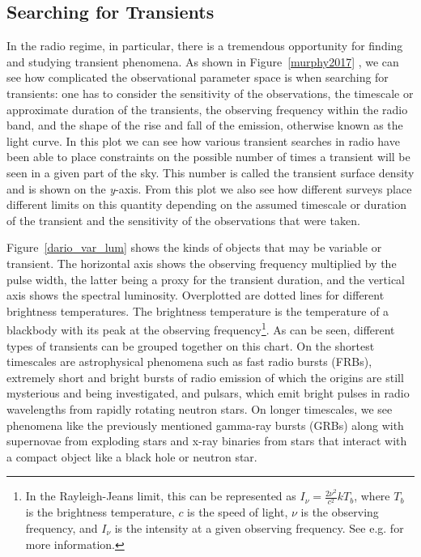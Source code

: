 \documentclass[12pt]{article}
\begin{document}
\subsection{Searching for Transients}


In the radio regime, in particular, there is a tremendous opportunity for finding and studying transient phenomena. As shown in Figure~\ref{murphy2017} \cite{2017MNRAS.466.1944M}, we can see how complicated the observational parameter space is when searching for transients: one has to consider the sensitivity of the observations, the timescale or approximate duration of the transients, the observing frequency within the radio band, and the shape of the rise and fall of the emission, otherwise known as the light curve. In this plot we can see how various transient searches in radio have been able to place constraints on the possible number of times a transient will be seen in a given part of the sky. This number is called the transient surface density and is shown on the \textit{y}-axis. From this plot we also see how different surveys place different limits on this quantity depending on the assumed timescale or duration of the transient and the sensitivity of the observations that were taken. 

Figure~\ref{dario_var_lum} \cite{2015MNRAS.446.3687P} shows the kinds of objects that may be variable or transient. The horizontal axis shows the observing frequency multiplied by the pulse width, the latter being a proxy for the transient duration, and the vertical axis shows the spectral luminosity. Overplotted are dotted lines for different brightness temperatures. The brightness temperature is the temperature of a blackbody with its peak at the observing frequency\footnote{In the Rayleigh-Jeans limit, this can be represented as $I_{\nu}=\frac{2\nu^2}{c^2}kT_b$, where $T_b$ is the brightness temperature, $c$ is the speed of light, $\nu$ is the observing frequency, and $I_{\nu}$ is the intensity at a given observing frequency. See e.g. \cite{1986rpa..book.....R} for more information.}. As can be seen, different types of transients can be grouped together on this chart. On the shortest timescales are astrophysical phenomena such as fast radio bursts (FRBs), extremely short and bright bursts of radio emission of which the origins are still mysterious and being investigated, and pulsars, which emit bright pulses in radio wavelengths from rapidly rotating neutron stars. On longer timescales, we see phenomena like the previously mentioned gamma-ray bursts (GRBs) along with supernovae from exploding stars and x-ray binaries from stars that interact with a compact object like a black hole or neutron star. 
\end{document}
